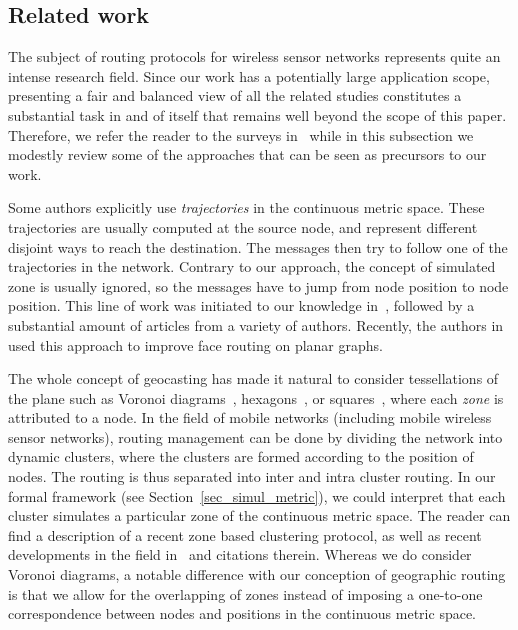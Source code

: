 \documentclass{article}
\begin{document}
\subsection*{Related work}
The subject of routing protocols for wireless sensor networks represents quite an intense research field. Since our work has a potentially large application scope, presenting a fair and balanced view of all the related studies constitutes a substantial task in and of itself that remains well beyond the scope of this paper.
Therefore, we refer the reader to the surveys in~\cite{bib_survey1,bib_survey2} while in this subsection we modestly review some of the approaches that can be seen as precursors to our work.

Some authors explicitly use {\em trajectories} in the continuous metric space. These trajectories are usually computed at the source node, and represent different disjoint ways to reach the destination. The messages then try to follow one of the trajectories in the network. Contrary to our approach, the concept of simulated zone is usually ignored, so the messages have to jump from node position to node position. This line of work was initiated to our knowledge in~\cite{bib_trajectory_old}, followed by a substantial amount of articles from a variety of authors. Recently, the authors in~\cite{bib_trajectory_new} used this approach to improve face routing on planar graphs.

The whole concept of geocasting has made it natural to consider tessellations of the plane such as Voronoi diagrams~\cite{bib_voronoi}, hexagons~\cite{bib_hexagon}, or squares~\cite{bib_square}, where each {\em zone} is attributed to a node.
In the field of mobile networks (including mobile wireless sensor networks), routing management can be done by dividing the network into dynamic clusters, where the clusters are formed according to the position of nodes.
 The routing is thus separated into inter and intra cluster routing.
In our formal framework (see Section~\ref{sec_simul_metric}), we could interpret that each cluster simulates a particular zone of the continuous metric space. The reader can find a description of a recent zone based clustering protocol, as well as recent developments in the field in~\cite{bib_zone} and citations therein. Whereas we do consider Voronoi diagrams, a notable difference with our conception of geographic routing is that we allow for the overlapping of zones instead of imposing a one-to-one correspondence between nodes and positions in the continuous metric space.
\end{document}
